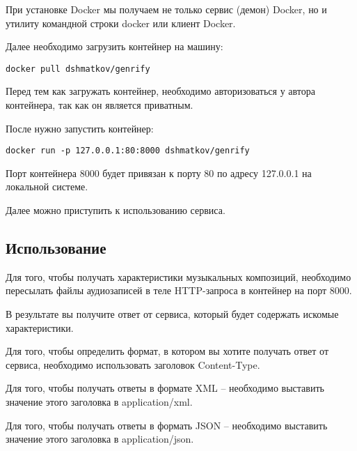 При установке Docker мы получаем не только сервис (демон) Docker, но и утилиту командной строки docker или клиент Docker.

Далее необходимо загрузить контейнер на машину:
\begin{lstlisting}
docker pull dshmatkov/genrify
\end{lstlisting}

Перед тем как загружать контейнер, необходимо авторизоваться у автора контейнера, так как он является приватным.

После нужно запустить контейнер:
\begin{lstlisting}
docker run -p 127.0.0.1:80:8000 dshmatkov/genrify
\end{lstlisting}

Порт контейнера 8000 будет привязан к порту 80 по адресу 127.0.0.1 на локальной системе.

Далее можно приступить к использованию сервиса.

\subsection{Использование}
\label{sec:manual:usage}

Для того, чтобы получать характеристики музыкальных композиций, необходимо пересылать файлы аудиозаписей в теле HTTP-запроса в контейнер на порт 8000.

В результате вы получите ответ от сервиса, который будет содержать искомые характеристики.

Для того, чтобы определить формат, в котором вы хотите получать ответ от сервиса, необходимо использовать заголовок Content-Type.

Для того, чтобы получать ответы в формате XML -- необходимо выставить значение этого заголовка в application/xml.

Для того, чтобы получать ответы в формать JSON -- необходимо выставить значение этого заголовка в application/json.
